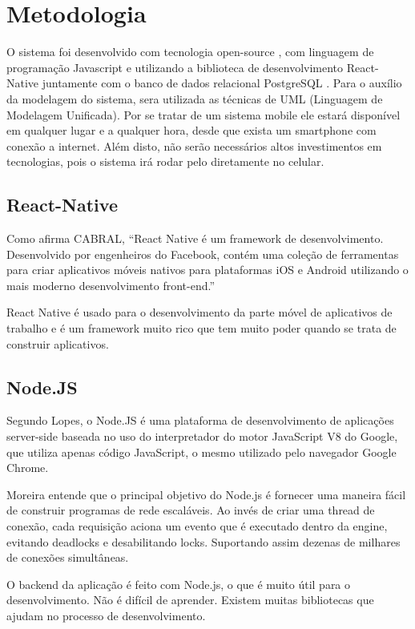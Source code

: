 \chapter{Metodologia}
O sistema foi desenvolvido com tecnologia open-source , com linguagem de programação Javascript e utilizando a biblioteca de desenvolvimento React-Native  juntamente com o banco de dados relacional PostgreSQL . Para o auxílio da modelagem do sistema, sera utilizada as técnicas de UML (Linguagem de Modelagem Unificada). Por se tratar de um sistema mobile ele estará disponível em qualquer lugar e a qualquer hora, desde que exista um smartphone com conexão a internet. Além disto, não serão necessários altos investimentos em tecnologias, pois o sistema irá rodar pelo diretamente no celular.

\section{React-Native}
Como afirma CABRAL, “React Native  é um framework de desenvolvimento.
Desenvolvido por engenheiros do Facebook, contém uma coleção de ferramentas para criar aplicativos móveis nativos para plataformas iOS e Android utilizando o mais moderno desenvolvimento front-end.”

React Native é usado para o desenvolvimento da parte móvel de aplicativos de trabalho e é um framework muito rico que tem muito poder quando se trata de construir aplicativos.

\section{Node.JS}
Segundo Lopes, o Node.JS \cite{nodejs} é uma plataforma de desenvolvimento de aplicações server-side baseada no uso do interpretador do motor JavaScript V8 do Google, que utiliza apenas código JavaScript, o mesmo utilizado pelo navegador Google Chrome.

Moreira  entende que o principal objetivo do Node.js é fornecer uma maneira fácil de construir programas de rede escaláveis. Ao invés de criar uma thread de conexão, cada requisição aciona um evento que é executado dentro da engine, evitando deadlocks e desabilitando locks. Suportando assim dezenas de milhares de conexões simultâneas. 

O backend da aplicação é feito com Node.js, o que é muito útil para o desenvolvimento. Não é difícil de aprender. Existem muitas bibliotecas que ajudam no processo de desenvolvimento.
